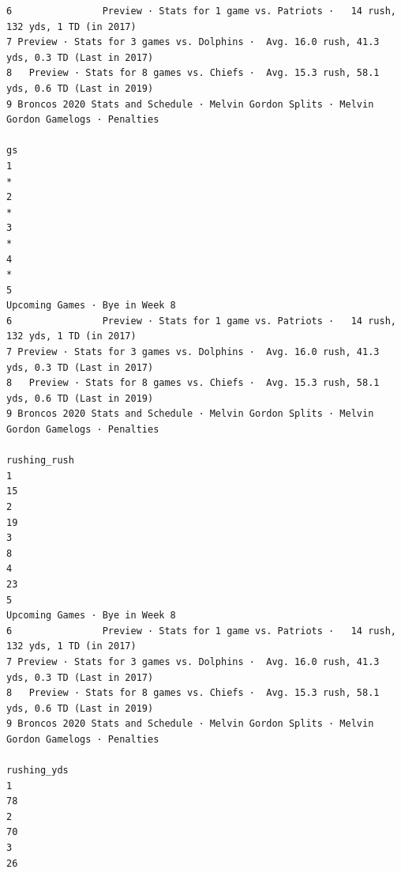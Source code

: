 \documentclass[
]{article}
\begin{document}
\begin{verbatim}
6                Preview · Stats for 1 game vs. Patriots ·   14 rush, 132 yds, 1 TD (in 2017)
7 Preview · Stats for 3 games vs. Dolphins ·  Avg. 16.0 rush, 41.3 yds, 0.3 TD (Last in 2017)
8   Preview · Stats for 8 games vs. Chiefs ·  Avg. 15.3 rush, 58.1 yds, 0.6 TD (Last in 2019)
9 Broncos 2020 Stats and Schedule · Melvin Gordon Splits · Melvin Gordon Gamelogs · Penalties
                                                                                           gs
1                                                                                           *
2                                                                                           *
3                                                                                           *
4                                                                                           *
5                                                              Upcoming Games · Bye in Week 8
6                Preview · Stats for 1 game vs. Patriots ·   14 rush, 132 yds, 1 TD (in 2017)
7 Preview · Stats for 3 games vs. Dolphins ·  Avg. 16.0 rush, 41.3 yds, 0.3 TD (Last in 2017)
8   Preview · Stats for 8 games vs. Chiefs ·  Avg. 15.3 rush, 58.1 yds, 0.6 TD (Last in 2019)
9 Broncos 2020 Stats and Schedule · Melvin Gordon Splits · Melvin Gordon Gamelogs · Penalties
                                                                                 rushing_rush
1                                                                                          15
2                                                                                          19
3                                                                                           8
4                                                                                          23
5                                                              Upcoming Games · Bye in Week 8
6                Preview · Stats for 1 game vs. Patriots ·   14 rush, 132 yds, 1 TD (in 2017)
7 Preview · Stats for 3 games vs. Dolphins ·  Avg. 16.0 rush, 41.3 yds, 0.3 TD (Last in 2017)
8   Preview · Stats for 8 games vs. Chiefs ·  Avg. 15.3 rush, 58.1 yds, 0.6 TD (Last in 2019)
9 Broncos 2020 Stats and Schedule · Melvin Gordon Splits · Melvin Gordon Gamelogs · Penalties
                                                                                  rushing_yds
1                                                                                          78
2                                                                                          70
3                                                                                          26

\end{verbatim}
\end{document}
